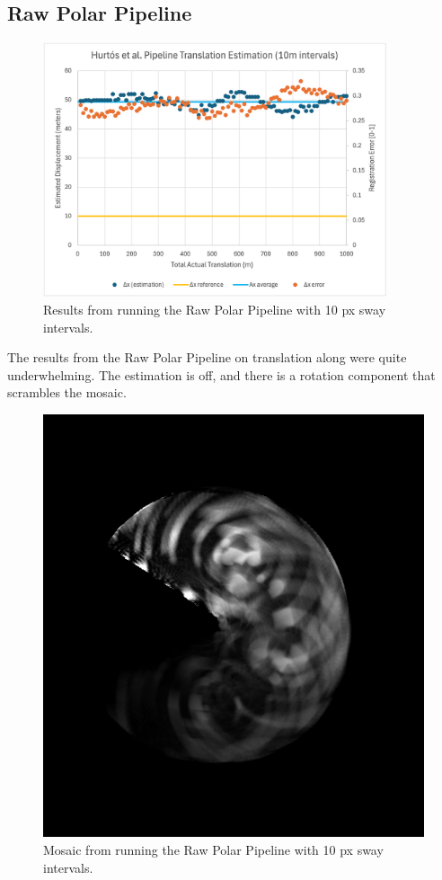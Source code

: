\subsection{Raw Polar Pipeline}
\label{sec:sway-hurtos}

\begin{figure}[H]
  \centering
  \includegraphics[width=0.9\textwidth]{figures/results/Translation-Graph/PC-0.png}
  \caption{Results from running the Raw Polar Pipeline with 10 px sway intervals.}
\end{figure}

The results from the Raw Polar Pipeline on translation along were quite underwhelming. The estimation is off, and there is a rotation component that scrambles the mosaic. 

\begin{figure}[H]
  \centering
  \includegraphics[width=.7\textwidth]{figures/results/Translation-Combined/PC-0.png}
  \caption{Mosaic from running the Raw Polar Pipeline with 10 px sway intervals.}
  \label{fig:pc-sway-mosaic}
\end{figure}

